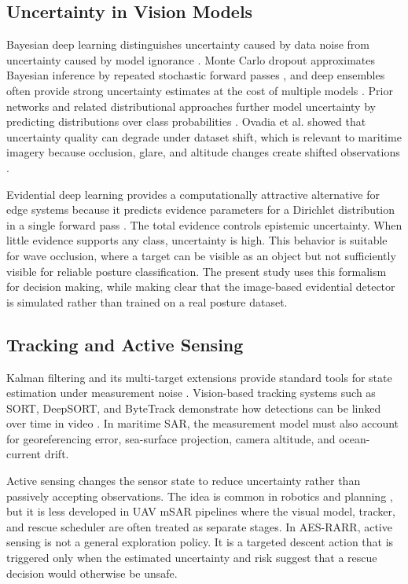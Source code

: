 \documentclass[runningheads]{llncs}
\newcommand{\aes}{AES-RARR}
\begin{document}
\subsection{Uncertainty in Vision Models}

Bayesian deep learning distinguishes uncertainty caused by data noise from uncertainty caused by model ignorance \cite{kendall2017uncertainties}. Monte Carlo dropout approximates Bayesian inference by repeated stochastic forward passes \cite{gal2016dropout}, and deep ensembles often provide strong uncertainty estimates at the cost of multiple models \cite{lakshminarayanan2017ensembles}. Prior networks and related distributional approaches further model uncertainty by predicting distributions over class probabilities \cite{malinin2018prior}. Ovadia et al. showed that uncertainty quality can degrade under dataset shift, which is relevant to maritime imagery because occlusion, glare, and altitude changes create shifted observations \cite{ovadia2019shift}.

Evidential deep learning provides a computationally attractive alternative for edge systems because it predicts evidence parameters for a Dirichlet distribution in a single forward pass \cite{sensoy2018edl}. The total evidence controls epistemic uncertainty. When little evidence supports any class, uncertainty is high. This behavior is suitable for wave occlusion, where a target can be visible as an object but not sufficiently visible for reliable posture classification. The present study uses this formalism for decision making, while making clear that the image-based evidential detector is simulated rather than trained on a real posture dataset.

\subsection{Tracking and Active Sensing}

Kalman filtering and its multi-target extensions provide standard tools for state estimation under measurement noise \cite{kalman1960filter,barshalom2001estimation,blackman1999design}. Vision-based tracking systems such as SORT, DeepSORT, and ByteTrack demonstrate how detections can be linked over time in video \cite{bewley2016sort,wojke2017deepsort,zhang2022bytetrack}. In maritime SAR, the measurement model must also account for georeferencing error, sea-surface projection, camera altitude, and ocean-current drift.

Active sensing changes the sensor state to reduce uncertainty rather than passively accepting observations. The idea is common in robotics and planning \cite{lavalle2006planning,thrun2005probabilistic}, but it is less developed in UAV mSAR pipelines where the visual model, tracker, and rescue scheduler are often treated as separate stages. In \aes, active sensing is not a general exploration policy. It is a targeted descent action that is triggered only when the estimated uncertainty and risk suggest that a rescue decision would otherwise be unsafe.
\end{document}
